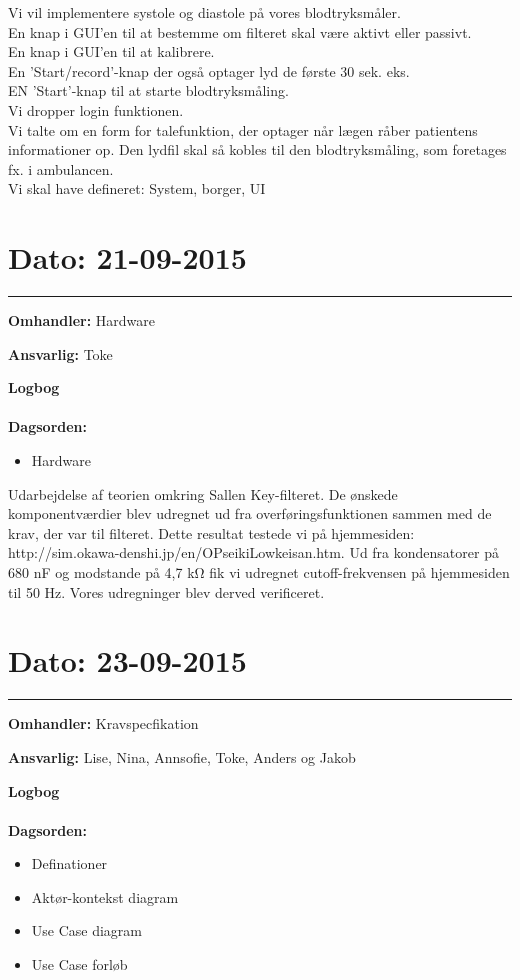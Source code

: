 Vi vil implementere systole og diastole på vores blodtryksmåler.\\
En knap i GUI'en til at bestemme om filteret skal være aktivt eller passivt.\\
En knap i GUI'en til at kalibrere.\\
En 'Start/record'-knap der også optager lyd de første 30 sek. eks.\\
EN 'Start'-knap til at starte blodtryksmåling.\\
Vi dropper login funktionen.\\
Vi talte om en form for talefunktion, der optager når lægen råber patientens informationer op. Den lydfil skal så kobles til den blodtryksmåling, som foretages fx. i ambulancen. \\
Vi skal have defineret: System, borger, UI


\section{Dato: 21-09-2015 }
\hrule

\textbf{Omhandler:} Hardware

\textbf{Ansvarlig:} Toke 

\textbf{Logbog}
\\
\\
\textbf{Dagsorden:}
\begin{itemize}
	\item Hardware
\end{itemize}

Udarbejdelse af teorien omkring Sallen Key-filteret. De ønskede komponentværdier blev udregnet ud fra overføringsfunktionen sammen med de krav, der var til filteret. Dette resultat testede vi på hjemmesiden:  http://sim.okawa-denshi.jp/en/OPseikiLowkeisan.htm. Ud fra kondensatorer på 680 nF og modstande på 4,7 kΩ fik vi udregnet cutoff-frekvensen på hjemmesiden til 50 Hz. Vores udregninger blev derved verificeret.


\section{Dato: 23-09-2015 }
\hrule

\textbf{Omhandler:} Kravspecfikation 

\textbf{Ansvarlig:} Lise, Nina, Annsofie, Toke, Anders og Jakob

\textbf{Logbog}
\\
\\
\textbf{Dagsorden:}
\begin{itemize}
	\item Definationer
	\item Aktør-kontekst diagram
	\item Use Case diagram
	\item Use Case forløb
\end{itemize}

